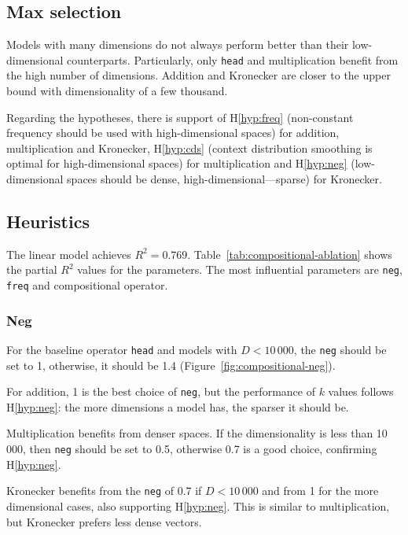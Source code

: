 \subsection{Max selection}
\label{sec:max-selection-compositional}

Models with many dimensions do not always perform better than their low-dimensional counterparts. Particularly, only \texttt{head} and multiplication benefit from the high number of dimensions. Addition and Kronecker are closer to the upper bound with dimensionality of a few thousand.

Regarding the hypotheses, there is support of H\ref{hyp:freq} (non-constant frequency should be used with high-dimensional spaces) for addition, multiplication and Kronecker, H\ref{hyp:cds} (context distribution smoothing is optimal for high-dimensional spaces) for multiplication and H\ref{hyp:neg} (low-dimensional spaces should be dense, high-dimensional---sparse) for Kronecker.

\subsection{Heuristics}
\label{sec:heuristics-compositional}



The linear model achieves  $R^2 = 0.769$. Table~\ref{tab:compositional-ablation} shows the partial $R^2$ values for the parameters. The most influential parameters are \texttt{neg}, \texttt{freq} and compositional operator.

\subsubsection{Neg}
\label{sec:neg-compositional}

For the baseline operator \texttt{head} and models with $D < 10\,000$, the \texttt{neg} should be set to 1, otherwise, it should be 1.4 (Figure~\ref{fig:compositional-neg}).

For addition, 1 is the best choice of \texttt{neg}, but the performance of $k$ values follows H\ref{hyp:neg}: the more dimensions a model has, the sparser it should be.

Multiplication benefits from denser spaces. If the dimensionality is less than 10\,000, then \texttt{neg} should be set to 0.5, otherwise 0.7 is a good choice, confirming H\ref{hyp:neg}.

Kronecker benefits from the \texttt{neg} of 0.7 if $D < 10\,000$ and from 1 for the more dimensional cases, also supporting H\ref{hyp:neg}. This is similar to multiplication, but Kronecker prefers less dense vectors.

